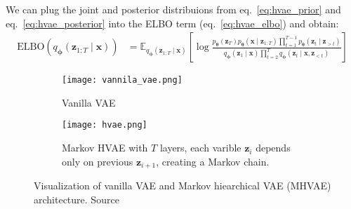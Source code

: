 We can plug the joint and posterior distribuions from eq.~\ref{eq:hvae_prior} and  eq.~\ref{eq:hvae_posterior} into the ELBO term (eq.~\ref{eq:hvae_elbo}) and obtain:
\begin{align}
    \mathrm{ELBO}(q_{\boldsymbol{\phi}}(\boldsymbol{z}_{1:T}\mid\boldsymbol{x}))  &=
    \mathbb{E}_{q_{\boldsymbol{\phi}}(\boldsymbol{z}_{1:T}\mid\boldsymbol{x})}\left[\log \frac{p_{\boldsymbol{\theta}}(\boldsymbol{z}_T)p_{\boldsymbol{\theta}}(\boldsymbol{x}\mid\boldsymbol{z}_{1:T})\prod_{t=1}^{T-1}p_{\boldsymbol{\theta}}(\boldsymbol{z}_{t}\mid\boldsymbol{z}_{>t})}{q_{\boldsymbol{\phi}}(\boldsymbol{z}_1\mid\boldsymbol{x})\prod_{t=2}^{T}q_{\boldsymbol{\phi}}(\boldsymbol{z}_{t}\mid\boldsymbol{x},\boldsymbol{z}_{<t})}\right]
\end{align}

\begin{figure}[]
    \centering
    \begin{subfigure}[b]{0.27\textwidth}
        \centering
        \texttt{[image: vannila\_vae.png]}
        \caption[]{Vanilla VAE}
        \label{fig:vanilla-vae}
    \end{subfigure}
    \hfill
    \begin{subfigure}[b]{0.63\textwidth}
        \centering
        \texttt{[image: hvae.png]}
        \caption[]{Markov HVAE with $T$ layers, each varible $\boldsymbol{z}_i$ depends only on previous $\boldsymbol{z}_{i+1}$, creating a Markov chain.}
        \label{fig:mhvae}
    \end{subfigure}
    \caption[VAE vs HVAE architecture]{Visualization of vanilla VAE and Markov hiearchical VAE (MHVAE) architecture. Source~\cite{diffusion-models-blog-2018}}
    \label{fig:vae-architecture}
\end{figure}

